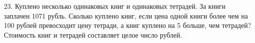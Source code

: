 23. Куплено несколько одинаковых книг и одинаковых тетрадей. За книги заплачен 1071 рубль. Сколько куплено книг, если цена одной книги более чем на 100 рублей превосходит цену тетради, а книг куплено на 5 больше, чем тетрадей? Стоимость книг и тетрадей составляет целое число рублей.\\
